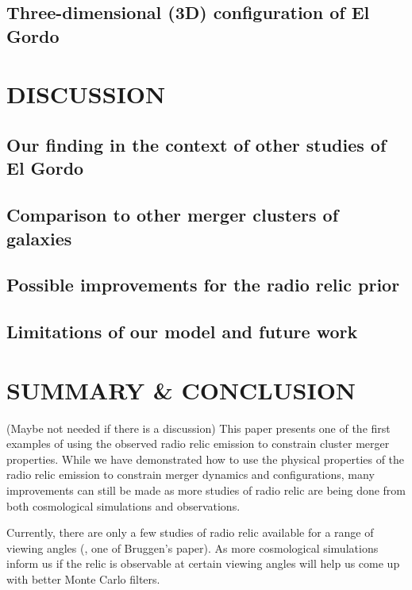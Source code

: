 \subsection{Three-dimensional (3D) configuration of El Gordo}


\section{DISCUSSION}
\subsection{Our finding in the context of other studies of El Gordo}


\subsection{Comparison to other merger clusters of galaxies}


\subsection{Possible improvements for the radio relic prior}


\subsection{Limitations of our model and future work} 



\section{SUMMARY \& CONCLUSION} (Maybe not needed if there is a discussion)
This paper presents one of the first examples of using the observed radio
relic emission to constrain cluster merger properties.
While we have demonstrated how to use the physical properties of the radio
relic emission to constrain merger dynamics and configurations, many
improvements can still be made as more studies of radio relic are being
done from both cosmological simulations and observations.

Currently, there are only a few studies of
 radio relic available for a range of viewing angles (, one of
Bruggen's paper). As more cosmological simulations inform us  
if the relic is observable at certain viewing angles will help us 
come up with better Monte Carlo filters. 

